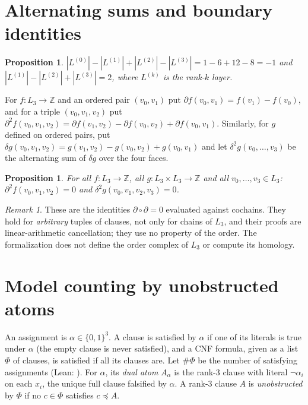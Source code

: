 \documentclass[11pt]{amsart}
\newtheorem{proposition}[theorem]{Proposition}
\theoremstyle{definition}
\theoremstyle{remark}
\newtheorem{remark}[theorem]{Remark}
\newcommand{\lean}[1]{\path{#1}}
\begin{document}
\section{Alternating sums and boundary identities}
\begin{proposition}\label{prop:euler}
$|L^{(0)}|-|L^{(1)}|+|L^{(2)}|-|L^{(3)}|=1-6+12-8=-1$ and $|L^{(1)}|-|L^{(2)}|+|L^{(3)}|=2$, where $L^{(k)}$ is the rank-$k$ layer.
\end{proposition}

For $f:L_3\to\mathbb{Z}$ and an ordered pair $(v_0,v_1)$ put $\partial f(v_0,v_1)=f(v_1)-f(v_0)$, and for a triple $(v_0,v_1,v_2)$ put $\partial^2f(v_0,v_1,v_2)=\partial f(v_1,v_2)-\partial f(v_0,v_2)+\partial f(v_0,v_1)$. Similarly, for $g$ defined on ordered pairs, put $\delta g(v_0,v_1,v_2)=g(v_1,v_2)-g(v_0,v_2)+g(v_0,v_1)$ and let $\delta^2g(v_0,\dots,v_3)$ be the alternating sum of $\delta g$ over the four faces.
\begin{proposition}\label{prop:dd}
For all $f:L_3\to\mathbb{Z}$, all $g:L_3\times L_3\to\mathbb{Z}$ and all $v_0,\dots,v_3\in L_3$: $\partial^2f(v_0,v_1,v_2)=0$ and $\delta^2g(v_0,v_1,v_2,v_3)=0$.
\end{proposition}
\begin{remark}
These are the identities $\partial\circ\partial=0$ evaluated against cochains. They hold for \emph{arbitrary} tuples of clauses, not only for chains of $L_3$, and their proofs are linear-arithmetic cancellation; they use no property of the order. The formalization does not define the order complex of $L_3$ or compute its homology.
\end{remark}

\section{Model counting by unobstructed atoms}
An assignment is $\alpha\in\{0,1\}^3$. A clause is satisfied by $\alpha$ if one of its literals is true under $\alpha$ (the empty clause is never satisfied), and a CNF formula, given as a list $\Phi$ of clauses, is satisfied if all its clauses are. Let $\#\Phi$ be the number of satisfying assignments (Lean: \lean{modelCount3}). For $\alpha$, its \emph{dual atom} $A_\alpha$ is the rank-$3$ clause with literal $\neg\alpha_i$ on each $x_i$, the unique full clause falsified by $\alpha$. A rank-$3$ clause $A$ is \emph{unobstructed} by $\Phi$ if no $c\in\Phi$ satisfies $c\preceq A$.
\end{document}
